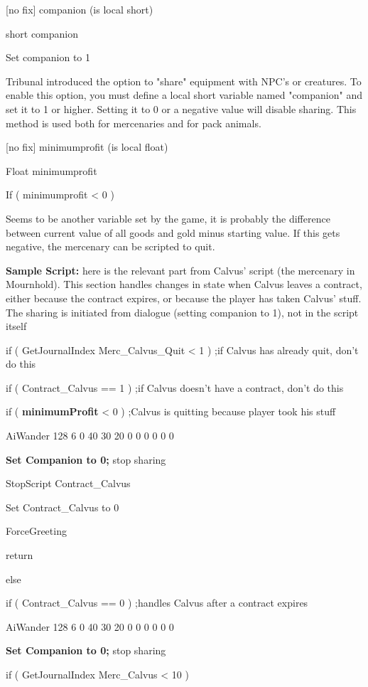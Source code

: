 \documentclass[
]{article}
\begin{document}
{[}no fix{]} companion (is local short)

short companion

Set companion to 1

Tribunal introduced the option to "share" equipment with NPC's or
creatures. To enable this option, you must define a local short variable
named "companion" and set it to 1 or higher. Setting it to 0 or a
negative value will disable sharing. This method is used both for
mercenaries and for pack animals.

{[}no fix{]} minimumprofit (is local float)

Float minimumprofit

If ( minimumprofit \textless{} 0 )

Seems to be another variable set by the game, it is probably the
difference between current value of all goods and gold minus starting
value. If this gets negative, the mercenary can be scripted to quit.

\textbf{Sample Script:} here is the relevant part from Calvus' script
(the mercenary in Mournhold). This section handles changes in state when
Calvus leaves a contract, either because the contract expires, or
because the player has taken Calvus' stuff. The sharing is initiated
from dialogue (setting companion to 1), not in the script itself

if ( GetJournalIndex Merc\_Calvus\_Quit \textless{} 1 ) ;if Calvus has
already quit, don't do this

if ( Contract\_Calvus == 1 ) ;if Calvus doesn't have a contract, don't
do this

if ( \textbf{minimumProfit} \textless{} 0 ) ;Calvus is quitting because
player took his stuff

AiWander 128 6 0 40 30 20 0 0 0 0 0 0

\textbf{Set Companion to 0;} stop sharing

StopScript Contract\_Calvus

Set Contract\_Calvus to 0

ForceGreeting

return

else

if ( Contract\_Calvus == 0 ) ;handles Calvus after a contract expires

AiWander 128 6 0 40 30 20 0 0 0 0 0 0

\textbf{Set Companion to 0;} stop sharing

if ( GetJournalIndex Merc\_Calvus \textless{} 10 )
\end{document}

